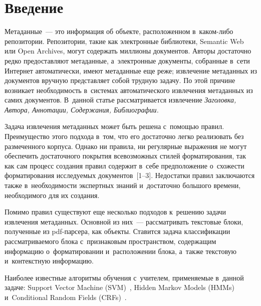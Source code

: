 \begin{multicols}{2}

\label{st\stat}


\section{Введение}

\vspace*{-2pt}

Метаданные~--- это информация об объекте, рас\-по\-ло\-жен\-ном в~ка\-ком-ли\-бо репозитории. 
Репозитории, такие как электронные биб\-лио\-те\-ки, Semantic Web или Open Archives, 
могут содержать миллионы документов. Авторы достаточно ред\-ко предоставляют 
метаданные, а~электронные документы, со\-бран\-ные в~сети Интернет автоматически, 
име\-ют метаданные еще реже; извлечение метаданных из документов вруч\-ную 
пред\-став\-ля\-ет собой труд\-ную задачу. По этой причине возникает не\-об\-хо\-ди\-мость 
в~сис\-те\-мах автоматического извлечения метаданных из самих документов. В~данной 
статье рас\-смат\-ри\-ва\-ет\-ся извлечение \textit{Заголовка, Автора, Аннотации, 
Содержания, Библиографии.}

Задача извлечения метаданных может быть решена с~помощью правил. Преимущество 
этого подхода в~том, что его достаточно легко реализовать без размеченного 
корпуса. Однако ни правила, ни регулярные выражения не могут обеспечить 
до\-ста\-точ\-но\-го покрытия все\-воз\-мож\-ных стилей форматирования, 
так как сам процесс 
со\-зда\-ния правил содержит в~себе предположение о~схо\-жести форматирования 
ис\-сле\-ду\-емых документов~[1--3]. Недостатки правил за\-клю\-ча\-ют\-ся также 
в~не\-об\-хо\-ди\-мости экспертных знаний и~до\-ста\-точ\-но большого времени, необходимого для 
их создания.

Помимо правил существуют еще несколько подходов к~решению задачи извлечения 
метаданных. Основной из них~--- рас\-смат\-ри\-вать текстовые блоки, полученные из 
pdf-пар\-се\-ра, как объекты. Ставится задача классификации рас\-смат\-ри\-ва\-емо\-го блока 
с~признаковым про\-стран\-ст\-вом, содержащим информацию о~форматировании и~расположении 
блока, а~так\-же текс\-то\-вую и~кон\-текст\-ную информацию.
{

}

Наиболее известные алгоритмы обуче\-ния с~учителем, при\-ме\-ня\-емые в~данной задаче: 
Support Vector Machine (SVM)~\cite{Han, Kovacevic}, Hidden Markov Models (HMMs)~\cite{Seymore} 
и~Conditional Random Fields (CRFs)~\cite{Councill}.


\end{multicols}
